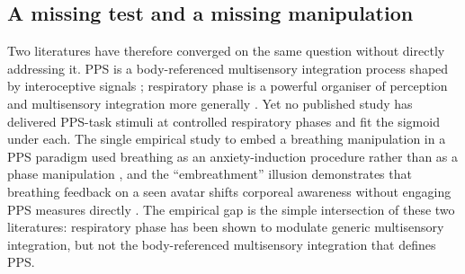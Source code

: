 \subsection{A missing test and a missing manipulation}


Two literatures have therefore converged on the same question without directly addressing it. PPS is a body-referenced multisensory integration process shaped by interoceptive signals \citep{Ardizzi2018, bogdanova_2021}; respiratory phase is a powerful organiser of perception and multisensory integration more generally \citep{saltafossi_2025, kluger_2021, grund_2021}. Yet no published study has delivered PPS-task stimuli at controlled respiratory phases and fit the sigmoid under each. The single empirical study to embed a breathing manipulation in a PPS paradigm used breathing as an anxiety-induction procedure rather than as a phase manipulation \citep{spaccasassi_2019}, and the ``embreathment'' illusion demonstrates that breathing feedback on a seen avatar shifts corporeal awareness without engaging PPS measures directly \citep{monti2020embreathment, Allard2017, Betka2020, Betka2022}. The empirical gap is the simple intersection of these two literatures: respiratory phase has been shown to modulate generic multisensory integration, but not the body-referenced multisensory integration that defines PPS.

